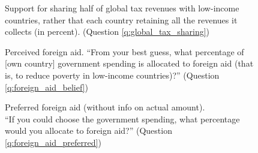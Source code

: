 \begin{figure}[h!]
    \caption[Support for sharing half of global tax revenues with low-income countries]{Support for sharing half of global tax revenues with low-income countries, rather that each country retaining all the revenues it collects (in percent). (Question \ref{q:global_tax_sharing})}\label{fig:global_tax_sharing}
\end{figure}

\begin{figure}[h!]
    \caption[Perceived foreign aid]{Perceived foreign aid. ``From your best guess, what percentage of [own country] government spending is allocated to foreign aid (that is, to reduce poverty in low-income countries)?'' (Question \ref{q:foreign_aid_belief})}\label{fig:foreign_aid_belief}
\end{figure}

\begin{figure}[h!]
    \caption[Preferred foreign aid (without info on actual amount)]{Preferred foreign aid (without info on actual amount). \\ ``If you could choose the government spending, what percentage would you allocate
    to foreign aid?'' (Question \ref{q:foreign_aid_preferred})}\label{fig:foreign_aid_preferred_no_info}
\end{figure}

